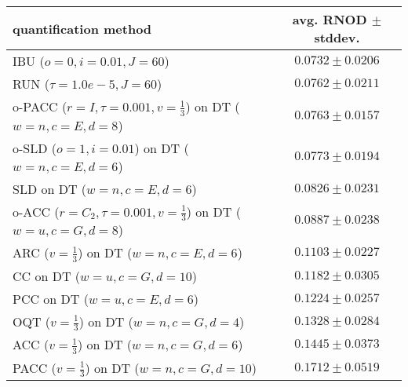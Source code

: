 \begin{tabular}{lc}
  \toprule
  quantification method & avg. RNOD $\pm$ stddev. \\
  \midrule
  IBU ($o=0, i=0.01, J=60$) & $\mathbf{0.0732 \pm 0.0206}$ \\
  RUN ($\tau=1.0e-5, J=60$) & $0.0762 \pm 0.0211$ \\
  o-PACC ($r=I, \tau=0.001, v=\frac{1}{3}$) on DT ($w=n, c=E, d=8$) & $0.0763 \pm 0.0157$ \\
  o-SLD ($o=1, i=0.01$) on DT ($w=n, c=E, d=6$) & $0.0773 \pm 0.0194$ \\
  SLD on DT ($w=n, c=E, d=6$) & $0.0826 \pm 0.0231$ \\
  o-ACC ($r=C_2, \tau=0.001, v=\frac{1}{3}$) on DT ($w=u, c=G, d=8$) & $0.0887 \pm 0.0238$ \\
  ARC ($v=\frac{1}{3}$) on DT ($w=n, c=E, d=6$) & $0.1103 \pm 0.0227$ \\
  CC on DT ($w=u, c=G, d=10$) & $0.1182 \pm 0.0305$ \\
  PCC on DT ($w=u, c=E, d=6$) & $0.1224 \pm 0.0257$ \\
  OQT ($v=\frac{1}{3}$) on DT ($w=n, c=G, d=4$) & $0.1328 \pm 0.0284$ \\
  ACC ($v=\frac{1}{3}$) on DT ($w=n, c=G, d=6$) & $0.1445 \pm 0.0373$ \\
  PACC ($v=\frac{1}{3}$) on DT ($w=n, c=G, d=10$) & $0.1712 \pm 0.0519$ \\
  \bottomrule
\end{tabular}
